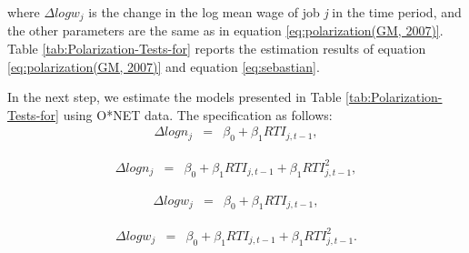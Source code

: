 \begin{onehalfspace}
where $\Delta logw_{j}$ is the change in the log mean wage of job
\emph{j }in the time period, and the other parameters are the same
as in equation \ref{eq:polarization(GM, 2007)}. Table \ref{tab:Polarization-Tests-for}
reports the estimation results of equation \ref{eq:polarization(GM, 2007)}
and equation \ref{eq:sebastian}.
\end{onehalfspace}
\begin{onehalfspace}
\begin{center}

\par\end{center}
\end{onehalfspace}

\vspace{-1cm}

In the next step, we estimate the models presented in Table \ref{tab:Polarization-Tests-for}
using O{*}NET data. The specification as follows:
\begin{eqnarray}
\Delta logn_{j} & = & \beta_{0}+\beta_{1}RTI_{j,t-1},\label{eq:logn-simple}
\end{eqnarray}

\begin{eqnarray}
\Delta logn_{j} & = & \beta_{0}+\beta_{1}RTI_{j,t-1}+\beta_{1}RTI_{j,t-1}^{2},\label{eq:logn-quadratic}
\end{eqnarray}

\begin{eqnarray}
\Delta logw_{j} & = & \beta_{0}+\beta_{1}RTI_{j,t-1},\label{eq:logw-simple}
\end{eqnarray}

\begin{eqnarray}
\Delta logw_{j} & = & \beta_{0}+\beta_{1}RTI_{j,t-1}+\beta_{1}RTI_{j,t-1}^{2}.\label{eq:logw-quadratic}
\end{eqnarray}

